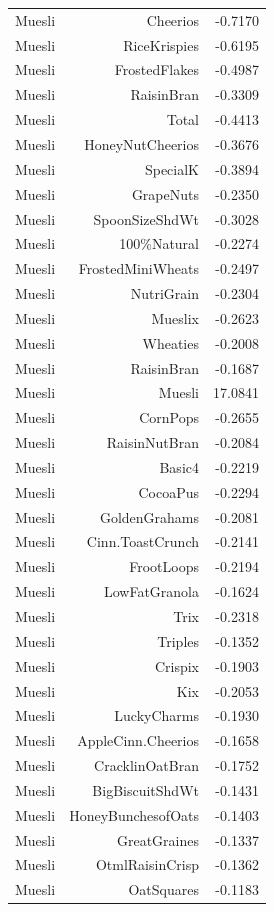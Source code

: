 \begin{longtable}{@{}lrr@{}}
Muesli & Cheerios & -0.7170 \\
Muesli & RiceKrispies & -0.6195 \\
Muesli & FrostedFlakes & -0.4987 \\
Muesli & RaisinBran & -0.3309 \\
Muesli & Total & -0.4413 \\
Muesli & HoneyNutCheerios & -0.3676 \\
Muesli & SpecialK & -0.3894 \\
Muesli & GrapeNuts & -0.2350 \\
Muesli & SpoonSizeShdWt & -0.3028 \\
Muesli & 100\%Natural & -0.2274 \\
Muesli & FrostedMiniWheats & -0.2497 \\
Muesli & NutriGrain & -0.2304 \\
Muesli & Mueslix & -0.2623 \\
Muesli & Wheaties & -0.2008 \\
Muesli & RaisinBran & -0.1687 \\
Muesli & Muesli & 17.0841 \\
Muesli & CornPops & -0.2655 \\
Muesli & RaisinNutBran & -0.2084 \\
Muesli & Basic4 & -0.2219 \\
Muesli & CocoaPus & -0.2294 \\
Muesli & GoldenGrahams & -0.2081 \\
Muesli & Cinn.ToastCrunch & -0.2141 \\
Muesli & FrootLoops & -0.2194 \\
Muesli & LowFatGranola & -0.1624 \\
Muesli & Trix & -0.2318 \\
Muesli & Triples & -0.1352 \\
Muesli & Crispix & -0.1903 \\
Muesli & Kix & -0.2053 \\
Muesli & LuckyCharms & -0.1930 \\
Muesli & AppleCinn.Cheerios & -0.1658 \\
Muesli & CracklinOatBran & -0.1752 \\
Muesli & BigBiscuitShdWt & -0.1431 \\
Muesli & HoneyBunchesofOats & -0.1403 \\
Muesli & GreatGraines & -0.1337 \\
Muesli & OtmlRaisinCrisp & -0.1362 \\
Muesli & OatSquares & -0.1183 \\

\end{longtable}
